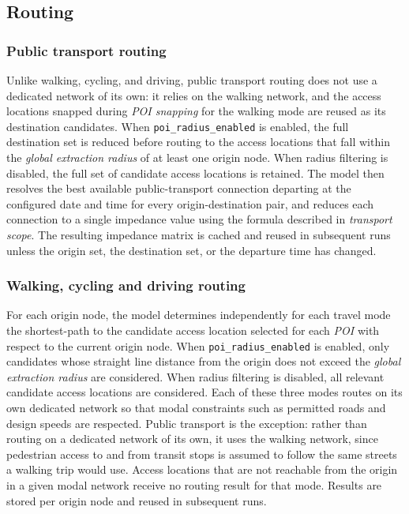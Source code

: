 \documentclass{article}
\begin{document}
\subsection{Routing}

\subsubsection*{Public transport routing}
Unlike walking, cycling, and driving, public transport routing does not use a
dedicated network of its own: it relies on the walking network, and the
access locations snapped during \emph{POI snapping} for the walking mode are
reused as its destination candidates. When \texttt{poi\_radius\_enabled} is enabled, the full destination set is
reduced before routing to the access locations that fall within the
\emph{global extraction radius} of at least one origin node. When radius
filtering is disabled, the full set of candidate access locations is retained. The model then resolves the best available public-transport connection departing at the configured date
and time for every origin-destination pair, and reduces each connection to
a single impedance value using the formula described in \emph{transport
scope}. The resulting impedance matrix is
cached and reused in subsequent runs unless the origin set, the destination
set, or the departure time has changed.

\subsubsection*{Walking, cycling and driving routing}
For each origin node, the model determines independently for each travel mode
the shortest-path to the candidate access location selected for each
\emph{POI} with respect to the current origin node. When
\texttt{poi\_radius\_enabled} is enabled, only candidates whose straight line
distance from the origin does not exceed the \emph{global extraction radius}
are considered. When radius filtering is disabled, all relevant candidate
access locations are considered. Each of these three modes routes on its own dedicated network so that modal constraints such as permitted roads and design speeds are respected. Public transport is the exception: rather than routing on a dedicated network of its own, it uses the walking network, since pedestrian access to and from transit stops is assumed to follow the same streets a walking trip would use. Access locations that are not
reachable from the origin in a given modal network receive no routing result
for that mode. Results are stored per origin node and reused in subsequent
runs.
\end{document}

